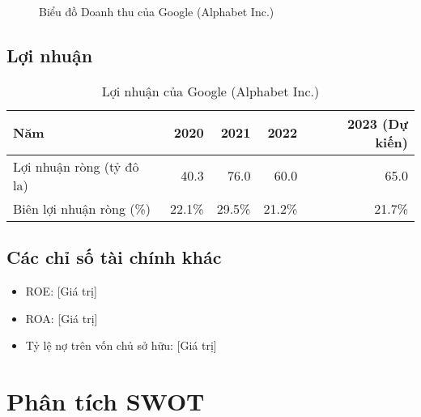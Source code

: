 \documentclass[12pt]{article}
\begin{document}
\begin{figure}[H]
    \centering
    \caption{Biểu đồ Doanh thu của Google (Alphabet Inc.)}
    \label{fig:revenue}
\end{figure}

\subsection{Lợi nhuận}

\begin{table}[H]
    \centering
    \begin{tabular}{lrrrr}
        \toprule
        Năm & 2020 & 2021 & 2022 & 2023 (Dự kiến) \\
        \midrule
        Lợi nhuận ròng (tỷ đô la) & 40.3 & 76.0 & 60.0 & 65.0 \\
        Biên lợi nhuận ròng (\%) & 22.1\% & 29.5\% & 21.2\% & 21.7\% \\
        \bottomrule
    \end{tabular}
    \caption{Lợi nhuận của Google (Alphabet Inc.)}
    \label{tab:profit}
\end{table}

\subsection{Các chỉ số tài chính khác}

\begin{itemize}
    \item ROE: [Giá trị]
    \item ROA: [Giá trị]
    \item Tỷ lệ nợ trên vốn chủ sở hữu: [Giá trị]
\end{itemize}

\section{Phân tích SWOT}
\end{document}
